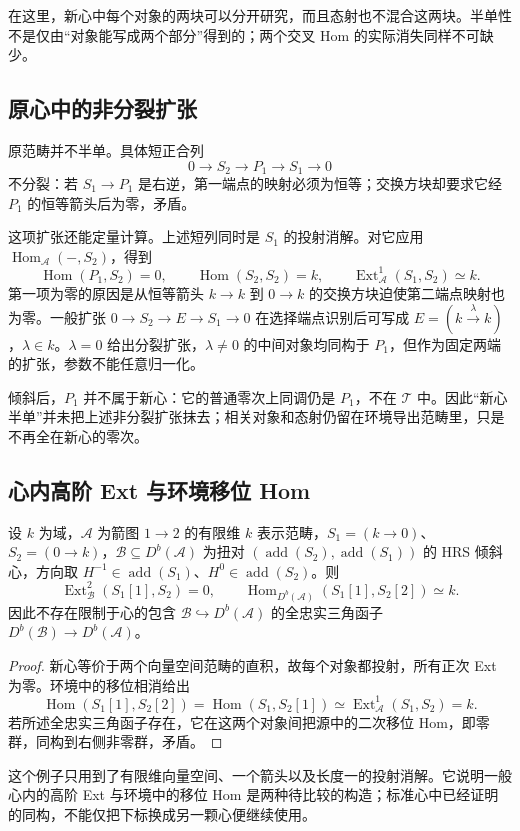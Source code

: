 在这里，新心中每个对象的两块可以分开研究，而且态射也不混合这两块。半单性不是仅由“对象能写成两个部分”得到的；两个交叉 Hom 的实际消失同样不可缺少。

\subsection{原心中的非分裂扩张}
\label{b4:subsec:1905:04}

原范畴并不半单。具体短正合列
\[
 0\longrightarrow S_2\longrightarrow P_1\longrightarrow S_1\longrightarrow0
\]
不分裂：若 \(S_1\to P_1\) 是右逆，第一端点的映射必须为恒等；交换方块却要求它经 \(P_1\) 的恒等箭头后为零，矛盾。

\ProseParagraphBreak
这项扩张还能定量计算。上述短列同时是 \(S_1\) 的投射消解。对它应用 \(\operatorname{Hom}_{\mathcal A}(-,S_2)\)，得到
\[
 \operatorname{Hom}(P_1,S_2)=0,
 \qquad \operatorname{Hom}(S_2,S_2)=k,
 \qquad \operatorname{Ext}_{\mathcal A}^1(S_1,S_2)\simeq k.
\]
第一项为零的原因是从恒等箭头 \(k\to k\) 到 \(0\to k\) 的交换方块迫使第二端点映射也为零。一般扩张 \(0\to S_2\to E\to S_1\to0\) 在选择端点识别后可写成 \(E=(k\xrightarrow{\lambda}k)\)，\(\lambda\in k\)。\(\lambda=0\) 给出分裂扩张，\(\lambda\ne0\) 的中间对象均同构于 \(P_1\)，但作为固定两端的扩张，参数不能任意归一化。

\ProseParagraphBreak
倾斜后，\(P_1\) 并不属于新心：它的普通零次上同调仍是 \(P_1\)，不在 \(\mathcal T\) 中。因此“新心半单”并未把上述非分裂扩张抹去；相关对象和态射仍留在环境导出范畴里，只是不再全在新心的零次。

\subsection{心内高阶 Ext 与环境移位 Hom}
\label{b4:subsec:1905:05}

\begin{proposition}\label{b4:prop:heart-higher-ext-mismatch}
设 \(k\) 为域，\(\mathcal A\) 为箭图 \(1\to2\) 的有限维 \(k\) 表示范畴，\(S_1=(k\to0)\)、\(S_2=(0\to k)\)，\(\mathcal B\subseteq D^b(\mathcal A)\) 为扭对 \((\operatorname{add}(S_2),\operatorname{add}(S_1))\) 的 HRS 倾斜心，方向取 \(H^{-1}\in\operatorname{add}(S_1)\)、\(H^0\in\operatorname{add}(S_2)\)。则
\[
 \operatorname{Ext}_{\mathcal B}^2(S_1[1],S_2)=0,
 \qquad
 \operatorname{Hom}_{D^b(\mathcal A)}(S_1[1],S_2[2])\simeq k.
\]
因此不存在限制于心的包含 \(\mathcal B\hookrightarrow D^b(\mathcal A)\) 的全忠实三角函子 \(D^b(\mathcal B)\to D^b(\mathcal A)\)。
\end{proposition}
\begin{proof}
新心等价于两个向量空间范畴的直积，故每个对象都投射，所有正次 Ext 为零。环境中的移位相消给出
\[
 \operatorname{Hom}(S_1[1],S_2[2])
 =\operatorname{Hom}(S_1,S_2[1])
 \simeq\operatorname{Ext}_{\mathcal A}^1(S_1,S_2)=k.
\]
若所述全忠实三角函子存在，它在这两个对象间把源中的二次移位 Hom，即零群，同构到右侧非零群，矛盾。
\end{proof}

这个例子只用到了有限维向量空间、一个箭头以及长度一的投射消解。它说明一般心内的高阶 Ext 与环境中的移位 Hom 是两种待比较的构造；标准心中已经证明的同构，不能仅把下标换成另一颗心便继续使用。
